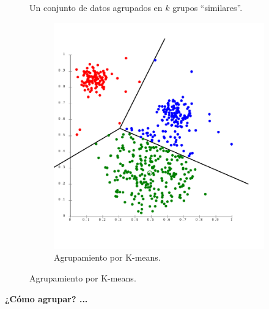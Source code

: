 \begin{frame}[plain]
  \begin{figure}
    Un conjunto de datos agrupados en $k$ grupos ``similares''.
    \centering
    \begin{subfigure}[b]{0.6\textwidth}
      \includegraphics[width=\textwidth]{./Imagenes/k-means.png}
      \caption*{Agrupamiento por K-means.}
    \end{subfigure}
  \end{figure}
  \textbf{¿Cómo agrupar? ...}
\end{frame}
